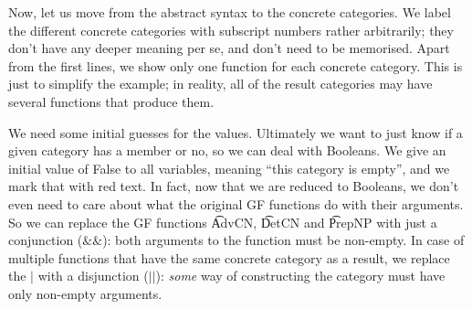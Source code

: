 Now, let us move from the \gf{} abstract syntax to the \pmcfg{} concrete
categories. We label the different concrete categories with
subscript numbers rather arbitrarily; they don't have any deeper
meaning per se, and don't need to be memorised. Apart from the first
lines, we show only one function for each concrete category. This is
just to simplify the example; in reality, all of the result categories
may have several functions that produce them.

\begin{EmptyItem}
\begin{Highlighting}[]
\OtherTok{::=}    \FunctionTok{|}    \NormalTok{;}
\OtherTok{::=}   \FunctionTok{|}  \NormalTok{;}
\OtherTok{::=}    \NormalTok{;}
\OtherTok{::=}    \NormalTok{;}
\OtherTok{::=}    \NormalTok{;}
\OtherTok{::=}  \NormalTok{;}
\OtherTok{::=}  \NormalTok{;}
\OtherTok{::=}  \NormalTok{;}
\end{Highlighting}
\end{EmptyItem}



We need some initial guesses for the values. Ultimately we want to
just know if a given category has a member or no, so we can deal with
Booleans. We give an initial value of False to all variables, meaning
``this category is empty'', and we mark that with red text.
In fact, now that we are reduced to Booleans, we don’t even need to
care about what the original GF functions do with their arguments. So
we can replace the GF functions \t{AdvCN}, \t{DetCN} and \t{PrepNP}
with just a conjunction ($\&\&$): both arguments to the function must
be non-empty. In case of multiple functions that have the same
concrete category as a result, we replace the $|$ with a disjunction
($||$): \emph{some} way of constructing the category must have only
non-empty arguments.

